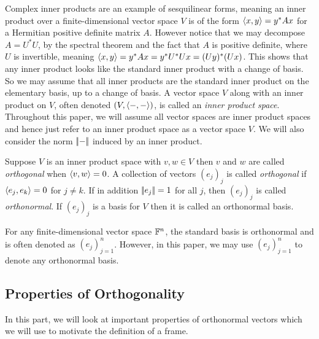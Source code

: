 {Complex inner products are an example of sesquilinear forms, meaning an inner product over a finite-dimensional vector space $V$ is of the form $\left\langle x,y \right\rangle=y^*Ax$ for a Hermitian positive definite matrix $A$. However notice that we may decompose $A=U^*U$, by the spectral theorem and the fact that $A$ is positive definite, where $U$ is invertible, meaning $\left\langle x,y \right\rangle=y^*Ax=y^*U^*Ux=(Uy)^*(Ux)$. This shows that any inner product looks like the standard inner product with a change of basis. So we may assume that all inner products are the standard inner product on the elementary basis, up to a change of basis.
}{A vector space $V$ along with an inner product on $V$, often denoted $(V,\left\langle -,- \right\rangle)$, is called an \textit{inner product space}. Throughout this paper, we will assume all vector spaces are inner product spaces and hence just refer to an inner product space as a vector space $V$. We will also consider the norm $\norm{-}$ induced by an inner product.}

\begin{Definition}
\label{def:ortho}
    Suppose $V$ is an inner product space with $v,w\in V$ then $v$ and $w$ are called \textit{orthogonal} when $\left\langle v,w \right\rangle=0$. A collection of vectors $(e_j)_j$ is called \textit{orthogonal} if $\left\langle e_j,e_k \right\rangle=0$ for $j\neq k$. If in addition $\norm{e_j}=1$ for all $j$, then $(e_j)_j$ is called \textit{orthonormal}. If $(e_j)_j$ is a basis for $V$ then it is called an orthonormal basis.
\end{Definition}

For any finite-dimensional vector space $\mathbb{F}^n$, the standard basis is orthonormal and is often denoted as $(e_j)_{j=1}^{n}$. However, in this paper, we may use $(e_j)_{j=1}^{n}$ to denote any orthonormal basis.

\subsection{Properties of Orthogonality}
\label{ssec:props_ortho}
In this part, we will look at important properties of orthonormal vectors which we will use to motivate the definition of a frame.


